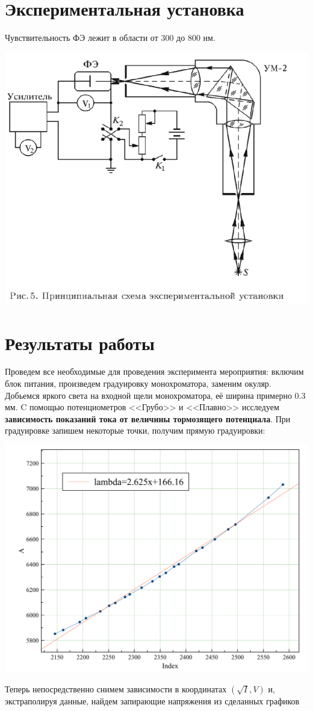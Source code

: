 \documentclass[a4paper,12pt]{article}
\begin{document}
		\section*{Экспериментальная установка}
		Чувствительность ФЭ лежит в области от $300$ до $800$ нм.
		\begin{center}
			\includegraphics[width = 80 mm]{ust}
		\end{center}
		\section*{Результаты работы}
		
			Проведем все необходимые для проведения эксперимента мероприятия: включим блок питания, произведем градуировку монохроматора, заменим окуляр. Добьемся яркого света на входной щели монохроматора, её ширина примерно 0.3 мм. C помощью потенциометров <<Грубо>> и <<Плавно>> исследуем \textbf{зависимость показаний тока от величины тормозящего потенциала}.
			При градуировке запишем некоторые точки, получим прямую градуировки:
			\begin{center}
				\includegraphics[width = 0.7\linewidth]{grad}
			\end{center}
			Теперь непосредственно снимем зависимости в координатах $(\sqrt{I}, V)$ и, экстраполируя данные, найдем запирающие напряжения из сделанных графиков
		
\end{document}
